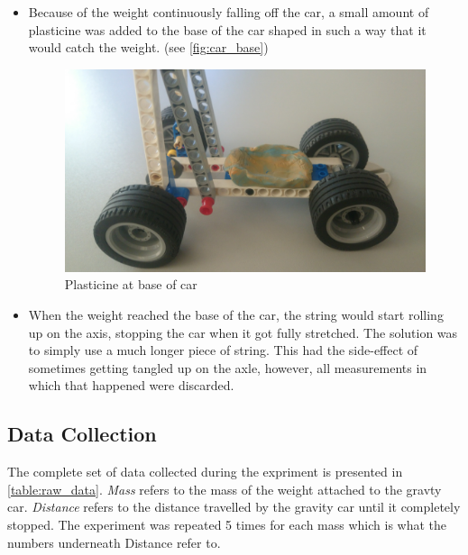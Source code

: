 \documentclass[titlepage,12pt]{article}
\let\oldsubsection\subsection
\renewcommand\subsection{\FloatBarrier \oldsubsection}
\begin{document}
\begin{itemize}
    \item Because of the weight continuously falling off the car, a small amount of
        plasticine was added to the base of the car shaped in such a way that it would catch
        the weight. (see \autoref{fig:car_base})
        \begin{figure}
            \centering
            \includegraphics[width=\textwidth]{photo_base.jpg}
            \caption{Plasticine at base of car}
            \label{fig:car_base}
        \end{figure}

    \item When the weight reached the base of the car, the string would start rolling up on
        the axis, stopping the car when it got fully stretched. The solution was to simply
        use a much longer piece of string. This had the side-effect of sometimes getting
        tangled up on the axle, however, all measurements in which that happened were
        discarded.
\end{itemize}

\subsection{Data Collection}

The complete set of data collected during the expriment is presented in
\autoref{table:raw_data}. \emph{Mass} refers to the mass of the weight attached to the
gravty car. \emph{Distance} refers to the distance travelled by the gravity car until it
completely stopped. The experiment was repeated 5 times for each mass which is what the
numbers underneath Distance refer to.
\end{document}
